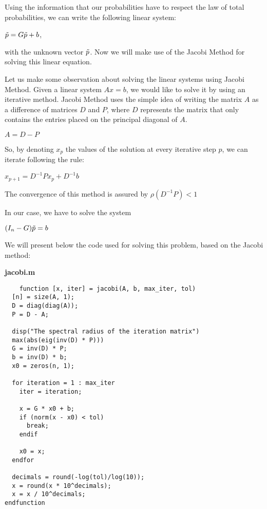 \documentclass{article}
\begin{document}
Using the information that our probabilities have to respect the law of total probabilities, we can write the following linear system:

\begin{center}
$\Tilde{p} = G \Tilde{p} + b$,
\end{center}

with the unknown vector $\Tilde{p}$. Now we will make use of the Jacobi Method for solving this linear equation.

Let us make some observation about solving the linear systems using Jacobi Method.
Given a linear system $Ax = b$, we would like to solve it by using an iterative method. Jacobi Method uses the simple idea of writing the matrix $A$ as a difference of matrices $D$ and $P$, where $D$ represents the matrix that only contains the entries placed on the principal diagonal of $A$.

\begin{center}$A = D - P$\end{center}

So, by denoting $x_{p}$ the values of the solution at every iterative step $p$, we can iterate following the rule:

\begin{center}
    $x_{p+1} = D^{-1} P x_{p} + D^{-1} b$
\end{center}

The convergence of this method is assured by $\rho(D^{-1} P) < 1$

In our case, we have to solve the system


\begin{center}
    $(I_n - G) \Tilde{p} = b$
\end{center}


We will present below the code used for solving this problem, based on the Jacobi method:


 \textbf{jacobi.m}
    \begin{lstlisting}
    function [x, iter] = jacobi(A, b, max_iter, tol)
  [n] = size(A, 1);
  D = diag(diag(A));
  P = D - A;
  
  disp("The spectral radius of the iteration matrix")
  max(abs(eig(inv(D) * P)))
  G = inv(D) * P;
  b = inv(D) * b;
  x0 = zeros(n, 1);
  
  for iteration = 1 : max_iter
    iter = iteration;
    
    x = G * x0 + b;
    if (norm(x - x0) < tol)
      break;
    endif
    
    x0 = x;
  endfor
  
  decimals = round(-log(tol)/log(10));
  x = round(x * 10^decimals);
  x = x / 10^decimals;
endfunction
    \end{lstlisting}  
\end{document}
